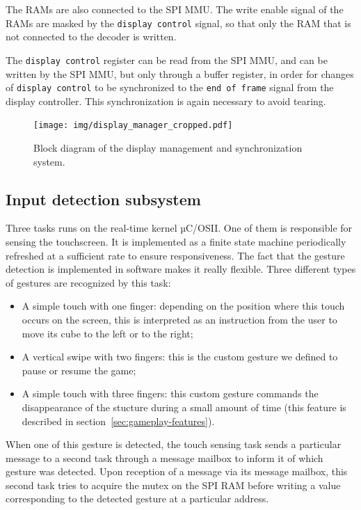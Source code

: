 \documentclass[english, DIV=13]{scrartcl}
\begin{document}
The RAMs are also connected to the SPI MMU. The write enable
signal of the RAMs are masked by the \texttt{display control} signal,
so that only the RAM that is not connected to the decoder is written.

The \texttt{display control} register can be read from the SPI MMU,
and can be written by the SPI MMU, but only through a buffer register,
in order for changes of \texttt{display control} to be synchronized
to the \texttt{end of frame} signal from the display controller.
This synchronization is again necessary to avoid tearing.

\begin{figure}
    \centering
    \texttt{[image: img/display\_manager\_cropped.pdf]}
    \caption{Block diagram of the display management and synchronization system.}
    \label{fig:display-manager}
\end{figure}

\subsection{Input detection subsystem}
\label{sec:input-det}

Three tasks runs on the real-time kernel µC/OSII. One of them is responsible
for sensing the touchscreen. It is implemented as a finite state machine periodically
refreshed at a sufficient rate to ensure responsiveness. The fact that the gesture
detection is implemented in software makes it really flexible. Three different types of
gestures are recognized by this task:
\begin{itemize}
    \item A simple touch with one finger: depending on the position where this touch
    occurs on the screen, this is interpreted as an instruction from the user to move
    its cube to the left or to the right;
    \item A vertical swipe with two fingers: this is the custom gesture we defined to
    pause or resume the game;
    \item A simple touch with three fingers: this custom gesture commands the
    disappearance of the stucture during a small amount of time (this feature is
    described in section~\ref{sec:gameplay-features}).
\end{itemize}
When one of this gesture is detected, the touch sensing task sends a particular
message to a second task through a message mailbox to inform it of which gesture
was detected. Upon reception of a message via its message mailbox, this second task
tries to acquire the mutex on the SPI RAM before writing a value corresponding
to the detected gesture at a particular address.
\end{document}
